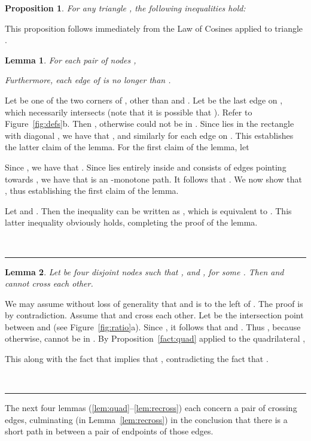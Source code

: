 \pdfoutput=1  \documentclass[11pt]{article}
\newtheorem{lemma}{Lemma}
\newcommand{\qed}{\rule{0.5em}{1.5ex}}
\newcommand{\fqed}{{\hfill~\qed}}
\newenvironment{proof}{{\noindent \bf Proof.}}
                      {{\hfill \fqed} \vspace{1em}}
\newtheorem{proposition}{Proposition}
\begin{document}
\begin{proposition}
For any triangle , the following inequalities hold:

\label{fact:tri}
\end{proposition}
This proposition follows immediately from the Law of Cosines applied
to triangle .

\begin{lemma}
For each pair of nodes ,

Furthermore, each edge of  is no longer than .
\label{lem:PR}
\end{lemma}
\begin{proof}
Let  be one of the two corners of , other than  and .
Let  be the last edge
on , which necessarily intersects
 (note that it is possible that ). Refer to
Figure~\ref{fig:defs}b.
Then , otherwise  could not be in .
Since  lies in the rectangle with diagonal , we have that
,
and similarly for each edge on .
This establishes the latter claim of the lemma. For the first claim of
the lemma, let

Since , we have that .
Since  lies entirely inside  and consists of edges pointing
towards , we have that  is an -monotone path. It follows that
. We now show that
, thus establishing the first
claim of the lemma.

Let  and . Then the inequality
 can be written as
, which is equivalent to
. This latter inequality obviously holds,
completing the proof of the lemma.
\end{proof}

\begin{lemma}
Let  be four disjoint nodes such that
, 
and , for some . Then  and 
cannot cross each other.
\label{lem:same.quadrant}
\end{lemma}
\begin{proof}
We may assume without loss of generality that  and  is to the
left of . The proof is by contradiction. Assume that  and  cross each
other. Let  be the intersection point between  and  (see Figure~\ref{fig:ratio}a).
Since ,
it follows that  and . Thus , because
otherwise,  cannot be in .
By
Proposition~\ref{fact:quad}
applied to the quadrilateral ,

This along with the fact that  implies that
, contradicting the fact that .
\end{proof}

The next four lemmas (\ref{lem:quad}--\ref{lem:recross})
each concern a pair of crossing  edges,
culminating (in Lemma~\ref{lem:recross}) in the conclusion
that there is a short path in  between a pair of endpoints
of those edges.
\end{document}

